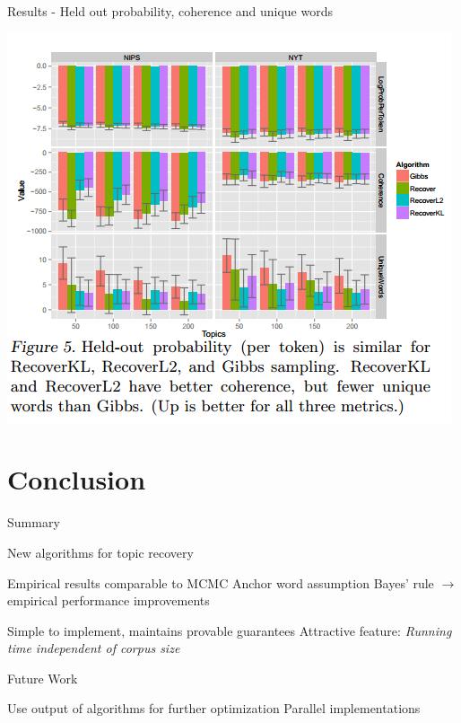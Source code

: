 \documentclass{lecture}
\begin{document}
\begin{plain}{Results - Held out probability, coherence and unique words}
\begin{center}
\includegraphics[scale=0.6]{figs/results_fig5}
\end{center}
\end{plain}

\section[Conclusion]{Conclusion}
\begin{plain}{Summary}
\begin{itemize}
\p New algorithms for topic recovery
	\begin{itemize}
		\p Empirical results comparable to MCMC
		\p Anchor word assumption
		\p Bayes' rule $\rightarrow$ empirical performance improvements
	\end{itemize}
\p Simple to implement, maintains provable guarantees
\p Attractive feature: \emph{Running time independent of corpus size} 
\end{itemize}
\end{plain}

\begin{plain}{Future Work}
\begin{itemize}
\p Use output of algorithms for further optimization
\p Parallel implementations
\end{itemize}
\end{plain}
\end{document}
